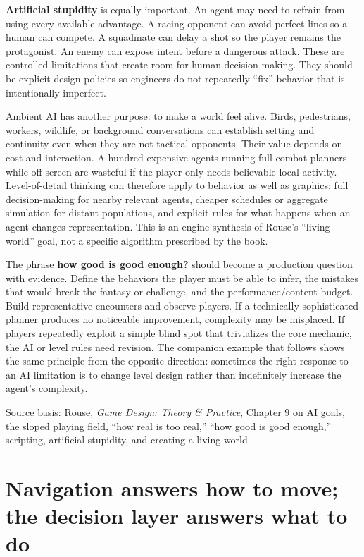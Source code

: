 \textbf{Artificial stupidity} is equally important. An agent may need to refrain from using every available advantage. A racing opponent can avoid perfect lines so a human can compete. A squadmate can delay a shot so the player remains the protagonist. An enemy can expose intent before a dangerous attack. These are controlled limitations that create room for human decision-making. They should be explicit design policies so engineers do not repeatedly ``fix'' behavior that is intentionally imperfect.

Ambient AI has another purpose: to make a world feel alive. Birds, pedestrians, workers, wildlife, or background conversations can establish setting and continuity even when they are not tactical opponents. Their value depends on cost and interaction. A hundred expensive agents running full combat planners while off-screen are wasteful if the player only needs believable local activity. Level-of-detail thinking can therefore apply to behavior as well as graphics: full decision-making for nearby relevant agents, cheaper schedules or aggregate simulation for distant populations, and explicit rules for what happens when an agent changes representation. This is an engine synthesis of Rouse's ``living world'' goal, not a specific algorithm prescribed by the book.

The phrase \textbf{how good is good enough?} should become a production question with evidence. Define the behaviors the player must be able to infer, the mistakes that would break the fantasy or challenge, and the performance/content budget. Build representative encounters and observe players. If a technically sophisticated planner produces no noticeable improvement, complexity may be misplaced. If players repeatedly exploit a simple blind spot that trivializes the core mechanic, the AI or level rules need revision. The companion example that follows shows the same principle from the opposite direction: sometimes the right response to an AI limitation is to change level design rather than indefinitely increase the agent's complexity.

Source basis: Rouse, \emph{Game Design: Theory \& Practice}, Chapter 9 on AI goals, the sloped playing field, ``how real is too real,'' ``how good is good enough,'' scripting, artificial stupidity, and creating a living world.

\section{Navigation answers how to move; the decision layer answers what to do}\label{06-engine-ii-ch047-navigation-answers-how-to-move-the-decision-layer-answers-what-to-do}

